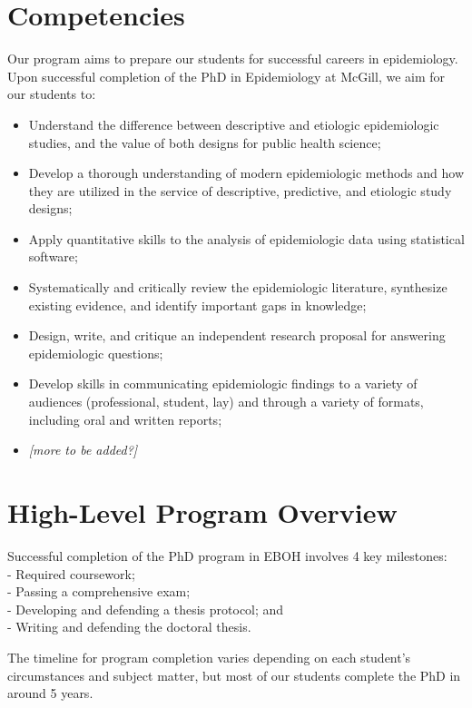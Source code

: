 \documentclass[
  openany]{book}
\providecommand{\tightlist}{%
  \setlength{\itemsep}{0pt}\setlength{\parskip}{0pt}}
\begin{document}
\hypertarget{competencies}{%
\section{Competencies}\label{competencies}}

Our program aims to prepare our students for successful careers in epidemiology. Upon successful completion of the PhD in Epidemiology at McGill, we aim for our students to:

\begin{itemize}
\tightlist
\item
  Understand the difference between descriptive and etiologic epidemiologic studies, and the value of both designs for public health science;
\item
  Develop a thorough understanding of modern epidemiologic methods and how they are utilized in the service of descriptive, predictive, and etiologic study designs;
\item
  Apply quantitative skills to the analysis of epidemiologic data using statistical software;
\item
  Systematically and critically review the epidemiologic literature, synthesize existing evidence, and identify important gaps in knowledge;
\item
  Design, write, and critique an independent research proposal for answering epidemiologic questions;
\item
  Develop skills in communicating epidemiologic findings to a variety of audiences (professional, student, lay) and through a variety of formats, including oral and written reports;
\item
  \emph{{[}more to be added?{]}}
\end{itemize}

\hypertarget{high-level-program-overview}{%
\section{High-Level Program Overview}\label{high-level-program-overview}}

Successful completion of the PhD program in EBOH involves 4 key milestones:\\
- Required coursework;\\
- Passing a comprehensive exam;\\
- Developing and defending a thesis protocol; and\\
- Writing and defending the doctoral thesis.

The timeline for program completion varies depending on each student's circumstances and subject matter, but most of our students complete the PhD in around 5 years.
\end{document}
